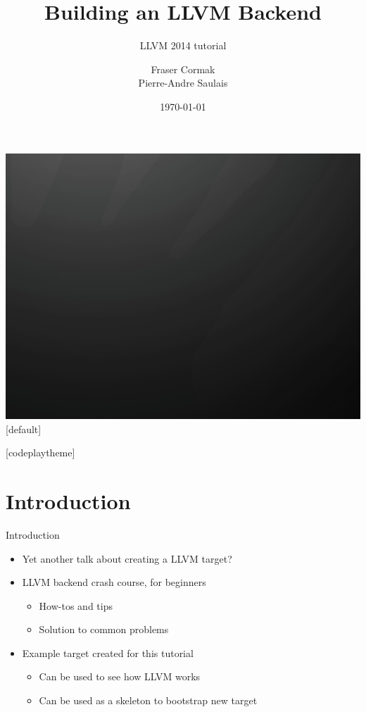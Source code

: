 \documentclass[t]{beamer}
\title{Building an LLVM Backend}
\subtitle{LLVM 2014 tutorial}
\author{Fraser Cormak \\ Pierre-Andre Saulais}
\institute{Codeplay Software @codeplaysoft}
\date{\today}
\begin{document}
{\includegraphics[width=\paperwidth,height=\paperheight]{dark_background_title.png}}
[default]

\begin{frame}
  \titlepage
\end{frame}


[codeplaytheme]

\section{Introduction}

\begin{frame}{Introduction}

\begin{itemize}
    \item Yet another talk about creating a LLVM target?
    \item LLVM backend crash course, for beginners
    \begin{itemize}
        \item How-tos and tips
        \item Solution to common problems
    \end{itemize}  
    \item Example target created for this tutorial
    \begin{itemize}
        \item Can be used to see how LLVM works
        \item Can be used as a skeleton to bootstrap new target
    \end{itemize}
\end{itemize}

\end{frame}
\end{document}
